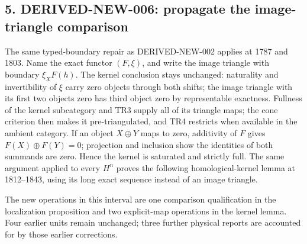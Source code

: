 \subsection{\texorpdfstring{5. DERIVED-NEW-006:\allowbreak{} propagate the image-triangle comparison}{5.  propagate the image-triangle comparison}}\label{proofs-1149-1843-derived-new-006-propagate-the-image-triangle-comparison}

The same typed-boundary repair as DERIVED-NEW-002 applies at 1787 and 1803. Name the exact functor \((F,\xi)\),\allowbreak{} and write the image triangle with boundary \(\xi_XF(h)\). The kernel conclusion stays unchanged:\allowbreak{} naturality and invertibility of \(\xi\) carry zero objects through both shifts; the image triangle with its first two objects zero has third object zero by representable exactness. Fullness of the kernel subcategory and TR3 supply all of its triangle maps; the cone criterion then makes it pre-triangulated,\allowbreak{} and TR4 restricts when available in the ambient category. If an object \(X\oplus Y\) maps to zero,\allowbreak{} additivity of \(F\) gives \(F(X)\oplus F(Y)=0\); projection and inclusion show the identities of both summands are zero. Hence the kernel is saturated and strictly full. The same argument applied to every \(H^n\) proves the following homological-kernel lemma at 1812–\allowbreak{}1843,\allowbreak{} using its long exact sequence instead of an image triangle.

The new operations in this interval are one comparison qualification in the localization proposition and two explicit-map operations in the kernel lemma. Four earlier units remain unchanged; three further physical reports are accounted for by those earlier corrections.
